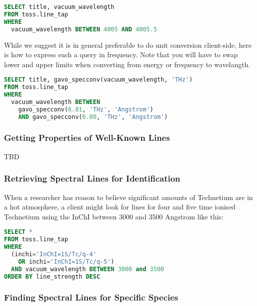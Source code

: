 \documentclass[11pt,a4paper]{ivoa}
\begin{document}
\begin{lstlisting}[language=SQL]
SELECT title, vacuum_wavelength
FROM toss.line_tap
WHERE
  vacuum_wavelength BETWEEN 4005 AND 4005.5
\end{lstlisting}

While we suggest it is in general preferable to do unit conversion
client-side, here is how to express such a query in
frequency.
Note that you will have to swap lower and upper limits when converting
from energy or frequency to wavelangth.

\begin{lstlisting}[language=SQL]
SELECT title, gavo_specconv(vacuum_wavelength, 'THz')
FROM toss.line_tap
WHERE
  vacuum_wavelength BETWEEN 
    gavo_specconv(6.01, 'THz', 'Angstrom')
    AND gavo_specconv(6.00, 'THz', 'Angstrom')
\end{lstlisting}


\subsubsection{Getting Properties of Well-Known Lines}

TBD

\subsubsection{Retrieving Spectral Lines for Identification}

When a researcher has reason to believe significant amounts of
Technetium are in a hot atmosphere, a client might look for lines for
four and five time ionised Technetium using the InChI between 3000 and
3500 Angstrom like this:

\begin{lstlisting}[language=SQL]
SELECT *
FROM toss.line_tap
WHERE
  (inchi='InChI=1S/Tc/q-4'
    OR inchi='InChI=1S/Tc/q-5')
  AND vacuum_wavelength BETWEEN 3000 and 3500
ORDER BY line_strength DESC
\end{lstlisting}

\subsubsection{Finding Spectral Lines for Specific Species}
\end{document}
